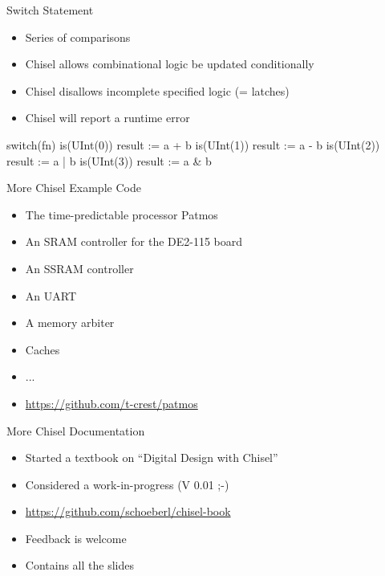 \documentclass[xcolor=pdflatex,dvipsnames,table]{beamer}
\begin{document}
\begin{frame}[fragile]{Switch Statement}
\begin{itemize}
\item Series of comparisons
\item Chisel allows combinational logic be updated conditionally 
\item Chisel disallows incomplete specified logic (= latches)
\item Chisel will report a runtime error
\end{itemize}
\begin{chisel}
switch(fn) {
  is(UInt(0)) { result := a + b }
  is(UInt(1)) { result := a - b }
  is(UInt(2)) { result := a | b }
  is(UInt(3)) { result := a & b }
}
\end{chisel}
\end{frame}

\begin{frame}[fragile]{More Chisel Example Code}
\begin{itemize}
\item The time-predictable processor Patmos
\item An SRAM controller for the DE2-115 board
\item An SSRAM controller
\item An UART
\item A memory arbiter
\item Caches
\item ...
\item \url{https://github.com/t-crest/patmos}
\end{itemize}
\end{frame}


\begin{frame}[fragile]{More Chisel Documentation}
\begin{itemize}
\item Started a textbook on ``Digital Design with Chisel''
\item Considered a work-in-progress (V 0.01 ;-)
\item \url{https://github.com/schoeberl/chisel-book}
\item Feedback is welcome
\item Contains all the slides
\end{itemize}
\end{frame}
\end{document}

